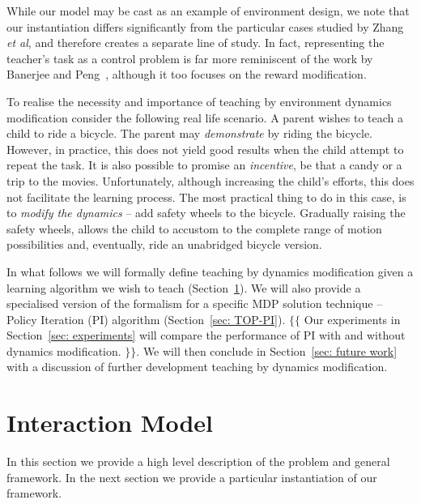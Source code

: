 \documentclass[letterpaper]{aamas2010}
\begin{document}
While our model may be cast as an example of environment design, we
note that our instantiation differs significantly from the particular
cases studied by Zhang \emph{et al}, and therefore creates a separate
line of study. In fact, representing the teacher's task as a control
problem is far more reminiscent of the work by Banerjee and
Peng~\cite{banerjee_peng_2005}, although it too focuses on the reward
modification.

To realise the necessity and importance of teaching by
environment dynamics modification consider the following real life
scenario. A parent wishes to teach a child to ride a bicycle. The
parent may {\em demonstrate} by riding the bicycle. However, in
practice, this does not yield good results when the child attempt to
repeat the task. It is also possible to promise an {\em incentive}, be
that a candy or a trip to the movies. Unfortunately, although
increasing the child's efforts, this does not facilitate the learning
process. The most practical thing to do in this case, is to {\em
  modify the dynamics} -- add safety wheels to the bicycle. Gradually
raising the safety wheels, allows the child to accustom to the
complete range of motion possibilities and, eventually, ride an
unabridged bicycle version.

In what follows we will formally define teaching by dynamics
modification given a learning algorithm we wish to teach
(Section~\ref{sec: GeneralModel}). We will also provide a specialised
version of the formalism for a specific MDP solution technique --
Policy Iteration (PI) algorithm (Section~\ref{sec: TOP-PI}). $\{\{$
Our experiments in Section~\ref{sec: experiments} will compare the
performance of PI with and without dynamics modification. $\}\}$. We
will then conclude in Section~\ref{sec: future work} with a discussion
of further development teaching by dynamics modification.


\section{Interaction Model}\label{sec: GeneralModel}

In this section we provide a high level description of the problem and
general framework.  In the next section we provide a particular
instantiation of our framework.
\end{document}
